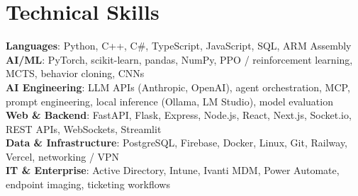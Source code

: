 \documentclass[letterpaper,11pt]{article}
\begin{document}
\section{Technical Skills}
 \begin{itemize}[leftmargin=0.15in, label={}]
    \small{\item{
     \textbf{Languages}{: Python, C++, C\#, TypeScript, JavaScript, SQL, ARM Assembly} \\
     \textbf{AI/ML}{: PyTorch, scikit-learn, pandas, NumPy, PPO / reinforcement learning, MCTS, behavior cloning, CNNs} \\
     \textbf{AI Engineering}{: LLM APIs (Anthropic, OpenAI), agent orchestration, MCP, prompt engineering, local inference (Ollama, LM Studio), model evaluation} \\
     \textbf{Web \& Backend}{: FastAPI, Flask, Express, Node.js, React, Next.js, Socket.io, REST APIs, WebSockets, Streamlit} \\
     \textbf{Data \& Infrastructure}{: PostgreSQL, Firebase, Docker, Linux, Git, Railway, Vercel, networking / VPN} \\
     \textbf{IT \& Enterprise}{: Active Directory, Intune, Ivanti MDM, Power Automate, endpoint imaging, ticketing workflows}
    }}
 \end{itemize}

\end{document}
